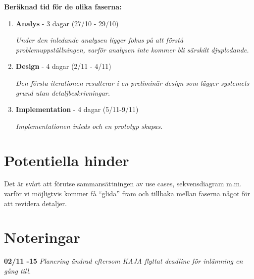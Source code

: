 \documentclass[a4paper]{article}
\begin{document}
    \textbf{Beräknad tid för de olika faserna:}

    \begin{enumerate}
        \item \textbf{Analys} - 3 dagar (27/10 - 29/10)

              \textit{Under den inledande analysen ligger fokus på att förstå
                      problemuppställningen, varför analysen inte kommer bli
                      särskilt djuplodande.}

        \item \textbf{Design} - 4 dagar (2/11 - 4/11)

              \textit{Den första iterationen resulterar i en preliminär design
                      som lägger systemets grund utan detaljbeskrivningar.}

        \item \textbf{Implementation} - 4 dagar (5/11-9/11)

              \textit{Implementationen inleds och en prototyp skapas.}
    \end{enumerate}

    \section{Potentiella hinder}

    Det är svårt att förutse sammansättningen av use cases, sekvensdiagram m.m.
    varför vi möjligtvis kommer få ``glida'' fram och tillbaka mellan faserna
    något för att revidera detaljer.

    \section{Noteringar}

    \textbf{02/11 -15} \textit{Planering ändrad eftersom KAJA flyttat deadline
                               för inlämning en gång till.}
\end{document}
